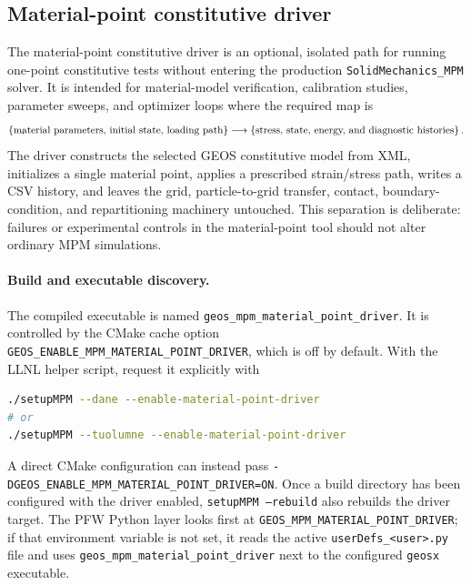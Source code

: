 \subsection{Material-point constitutive driver}
\label{subsec:material-point-driver}

The material-point constitutive driver is an optional, isolated path for running one-point constitutive tests without entering the production \texttt{SolidMechanics\_MPM} solver.  It is intended for material-model verification, calibration studies, parameter sweeps, and optimizer loops where the required map is
\begin{equation}
  \left\{\hbox{material parameters, initial state, loading path}\right\}
  \longrightarrow
  \left\{\hbox{stress, state, energy, and diagnostic histories}\right\}.
\end{equation}
The driver constructs the selected GEOS constitutive model from XML, initializes a single material point, applies a prescribed strain/stress path, writes a CSV history, and leaves the grid, particle-to-grid transfer, contact, boundary-condition, and repartitioning machinery untouched.  This separation is deliberate: failures or experimental controls in the material-point tool should not alter ordinary MPM simulations.

\paragraph{Build and executable discovery.}
The compiled executable is named \texttt{geos\_mpm\_material\_point\_driver}.  It is controlled by the CMake cache option \texttt{GEOS\_ENABLE\_MPM\_MATERIAL\_POINT\_DRIVER}, which is off by default.  With the LLNL helper script, request it explicitly with
\begin{lstlisting}[language=bash,caption={Building the optional material-point executable.},label={lst:material-point-build},basicstyle=\ttfamily\small]
./setupMPM --dane --enable-material-point-driver
# or
./setupMPM --tuolumne --enable-material-point-driver
\end{lstlisting}
A direct CMake configuration can instead pass \texttt{-DGEOS\_ENABLE\_MPM\_MATERIAL\_POINT\_DRIVER=ON}.  Once a build directory has been configured with the driver enabled, \texttt{setupMPM --rebuild} also rebuilds the driver target.  The PFW Python layer looks first at \texttt{GEOS\_MPM\_MATERIAL\_POINT\_DRIVER}; if that environment variable is not set, it reads the active \texttt{userDefs\_<user>.py} file and uses \texttt{geos\_mpm\_material\_point\_driver} next to the configured \texttt{geosx} executable.


